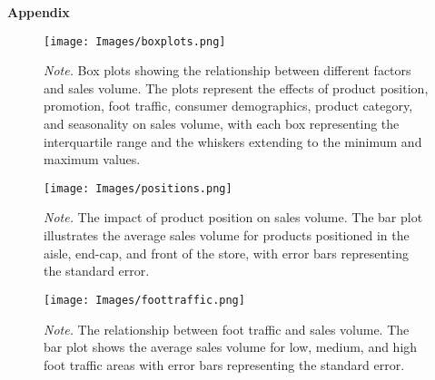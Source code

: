 \documentclass[stu,12pt,floatsintext]{apa7}
\begin{document}
\newpage
\begin{center}
\textbf{\normalsize Appendix}


\begin{figure}[h]
    \centering
    \captionsetup{justification=raggedright,singlelinecheck=false}
    \caption{}
    \label{fig:mesh1}
    \texttt{[image: Images/boxplots.png]}
    \caption*{\emph{Note.} Box plots showing the relationship between different factors and sales volume. The plots represent the effects of product position, promotion, foot traffic, consumer demographics, product category, and seasonality on sales volume, with each box representing the interquartile range and the whiskers extending to the minimum and maximum values.}
\end{figure}


\begin{figure}[h]
    \centering
    \captionsetup{justification=raggedright,singlelinecheck=false}
    \caption{}
    \label{fig:mesh1}
    \texttt{[image: Images/positions.png]}
    \caption*{\emph{Note.} The impact of product position on sales volume. The bar plot illustrates the average sales volume for products positioned in the aisle, end-cap, and front of the store, with error bars representing the standard error.}
\end{figure}

\begin{figure}[h]
    \centering
    \captionsetup{justification=raggedright,singlelinecheck=false}
    \caption{}
    \label{fig:mesh1}
    \texttt{[image: Images/foottraffic.png]}
    \caption*{\emph{Note.} The relationship between foot traffic and sales volume. The bar plot shows the average sales volume for low, medium, and high foot traffic areas with error bars representing the standard error.}
\end{figure}

\end{center}
\end{document}
